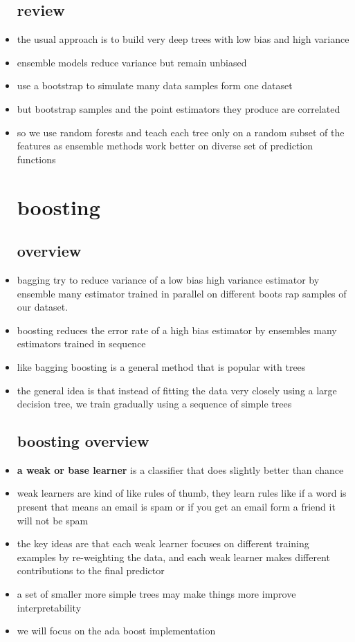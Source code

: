 \documentclass{article}
\begin{document}
\begin{itemize}
\subsection*{ review}
\item the usual approach is to build very deep trees with low bias and high variance
\item ensemble models reduce variance but remain unbiased 
\item use a bootstrap to simulate many data samples form one dataset 
\item but bootstrap samples and the point estimators they produce are correlated
\item so we use random forests and teach each tree only on a random subset of the features as ensemble methods work better on diverse set of prediction functions 

\section*{boosting}
\subsection*{overview}
\item bagging try to reduce variance of a low bias high variance estimator by ensemble many estimator trained in parallel on different boots rap samples of our dataset.
\item boosting reduces the error rate of a high bias estimator by ensembles many estimators trained in sequence 
\item like bagging boosting is a general method that is popular with trees 
\item the general idea is that instead of fitting the data very closely using a large decision tree, we train gradually using a sequence of simple trees
\subsection*{boosting overview}
\item \textbf{a weak or base learner} is a classifier that does slightly better than chance
\item weak learners are kind of like rules of thumb, they learn rules like if a word is present that means an email is spam or if you get an email form a friend it will not be spam 
\item the key ideas are that each weak learner focuses on different training examples by re-weighting the data, and each weak learner makes different contributions to the final predictor
\item a set of smaller more simple trees may make things more improve interpretability
\item we will focus on the ada boost implementation

\end{itemize}
\end{document}
